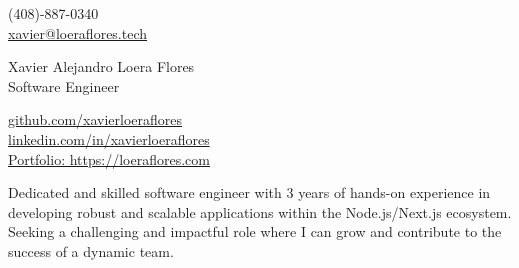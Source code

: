 \documentclass[a4,10pt]{article}
\begin{document}
\begin{center}
    \begin{minipage}[b]{0.29\textwidth}
            (408)-887-0340 \\
            \href{mailto:xavier@loeraflores.tech}{xavier@loeraflores.tech} 
    \end{minipage}%
    \begin{minipage}[b]{0.4\textwidth}
            \centering
            {\Large Xavier Alejandro Loera Flores} \\ %
            \vspace{0.1cm}
            {\color{UI_blue} \Large{Software Engineer}} \\
    \end{minipage}%
    \begin{minipage}[b]{0.29\textwidth}
            \flushright  %
            {\href{https://github.com/xavierloeraflores}{github.com/xavierloeraflores} } \\
            {\href{https://www.linkedin.com/in/xavierloeraflores}{linkedin.com/in/xavierloeraflores} } \\
            {\href{https://loeraflores.com}{Portfolio: https://loeraflores.com}}
    \end{minipage}   
    
\vspace{-0.15cm} 
{\color{UI_blue} \hrulefill}
\end{center}
\vspace{-0.25cm}

{Dedicated and skilled software engineer with 3 years of hands-on experience in developing robust and scalable applications within the Node.js/Next.js ecosystem. Seeking a challenging and impactful role where I can grow and contribute to the success of a dynamic team.}
\vspace{-0.4cm}

\end{document}
